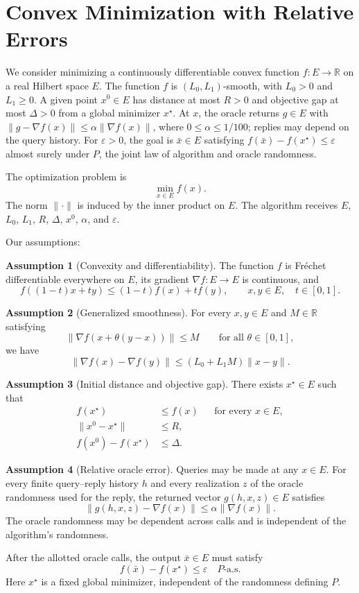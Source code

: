 \documentclass[10pt]{article}
\theoremstyle{definition}
\newtheorem{assumption}{Assumption}
\begin{document}
\section*{Convex Minimization with Relative Errors}
We consider minimizing a continuously differentiable convex function $f:E\to\mathbb{R}$ on a real Hilbert space $E$. The function $f$ is $(L_0,L_1)$-smooth, with $L_0>0$ and $L_1\geq0$. A given point $x^0\in E$ has distance at most $R>0$ and objective gap at most $\Delta>0$ from a global minimizer $x^\star$. At $x$, the oracle returns $g\in E$ with $\|g-\nabla f(x)\|\leq\alpha\|\nabla f(x)\|$, where $0\leq\alpha\leq1/100$; replies may depend on the query history. For $\varepsilon>0$, the goal is $\bar{x}\in E$ satisfying $f(\bar{x})-f(x^\star)\leq\varepsilon$ almost surely under $P$, the joint law of algorithm and oracle randomness.

The optimization problem is
\[
\min_{x\in E} f(x).
\]
The norm $\|\cdot\|$ is induced by the inner product on $E$. The algorithm receives $E$, $L_0$, $L_1$, $R$, $\Delta$, $x^0$, $\alpha$, and $\varepsilon$.

Our assumptions:
\begin{assumption}[Convexity and differentiability]
The function $f$ is Fr\'echet differentiable everywhere on $E$, its gradient $\nabla f:E\to E$ is continuous, and
\[
f((1-t)x+ty)\leq(1-t)f(x)+t f(y),
\qquad x,y\in E,\quad t\in[0,1].
\]
\end{assumption}

\begin{assumption}[Generalized smoothness]
For every $x,y\in E$ and $M\in\mathbb{R}$ satisfying
\[
\|\nabla f(x+\theta(y-x))\|\leq M
\qquad\text{for all }\theta\in[0,1],
\]
we have
\[
\|\nabla f(x)-\nabla f(y)\|
\leq (L_0+L_1M)\|x-y\|.
\]
\end{assumption}

\begin{assumption}[Initial distance and objective gap]
There exists $x^\star\in E$ such that
\[
\begin{aligned}
f(x^\star)&\leq f(x) &&\text{for every }x\in E,\\
\|x^0-x^\star\|&\leq R,\\
f(x^0)-f(x^\star)&\leq\Delta.
\end{aligned}
\]
\end{assumption}

\begin{assumption}[Relative oracle error]
Queries may be made at any $x\in E$. For every finite query--reply history $h$ and every realization $z$ of the oracle randomness used for the reply, the returned vector $g(h,x,z)\in E$ satisfies
\[
\|g(h,x,z)-\nabla f(x)\|
\leq\alpha\|\nabla f(x)\|.
\]
The oracle randomness may be dependent across calls and is independent of the algorithm's randomness.
\end{assumption}

After the allotted oracle calls, the output $\bar{x}\in E$ must satisfy
\[
f(\bar{x})-f(x^\star)\leq\varepsilon
\quad P\text{-a.s.}
\]
Here $x^\star$ is a fixed global minimizer, independent of the randomness defining $P$.
\end{document}
